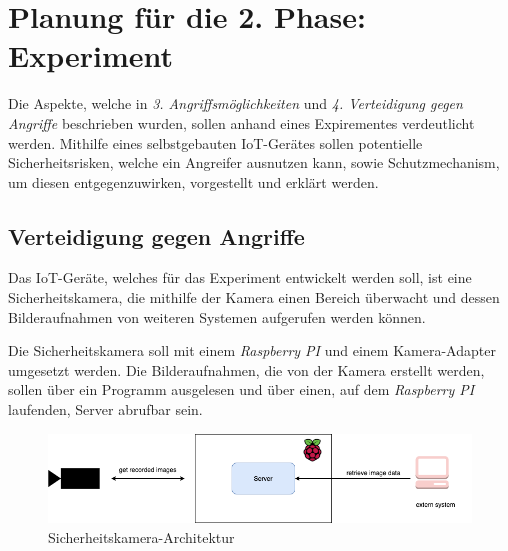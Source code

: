 \section{Planung für die 2. Phase: Experiment}
Die Aspekte, welche in \textit{3. Angriffsmöglichkeiten} und \textit{4. Verteidigung gegen Angriffe} beschrieben wurden, sollen anhand
eines Expirementes verdeutlicht werden. Mithilfe eines selbstgebauten IoT-Gerätes sollen potentielle Sicherheitsrisken, 
welche ein Angreifer ausnutzen kann, sowie Schutzmechanism, um diesen entgegenzuwirken, vorgestellt und erklärt werden.

\subsection{Verteidigung gegen Angriffe}
Das IoT-Geräte, welches für das Experiment entwickelt werden soll, ist eine Sicherheitskamera, die mithilfe der Kamera
einen Bereich überwacht und dessen Bilderaufnahmen von  weiteren Systemen aufgerufen werden können.

Die Sicherheitskamera soll mit einem \textit{Raspberry PI} und einem Kamera-Adapter umgesetzt werden.
Die Bilderaufnahmen, die von der Kamera erstellt werden, sollen über ein Programm ausgelesen und über
einen, auf dem \textit{Raspberry PI} laufenden, Server abrufbar sein. \\

	\begin{figure}[h]
		\centering
		\includegraphics[width=145mm]{images/raspberrypi.png}
		\caption{Sicherheitskamera-Architektur}
		\label{fig:arch-raspberrypi}
	\end{figure}

